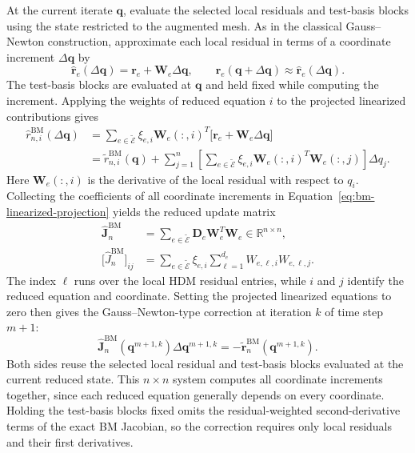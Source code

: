 \documentclass[a4paper,12pt]{article}
\newcommand{\vect}[1]{\boldsymbol{#1}}
\newcommand{\matr}[1]{\boldsymbol{#1}}
\begin{document}
At the current iterate $\vect{q}$, evaluate the selected local residuals and test-basis blocks using the state restricted to the augmented mesh. As in the classical Gauss--Newton construction, approximate each local residual in terms of a coordinate increment $\Delta\vect{q}$ by
\begin{equation}
 \widehat{\vect{r}}_e(\Delta\vect{q})
 =\vect{r}_e+\matr{W}_e\Delta\vect{q},
 \qquad
 \vect{r}_e(\vect{q}+\Delta\vect{q})\approx\widehat{\vect{r}}_e(\Delta\vect{q}).
 \label{eq:bm-linearized-local}
\end{equation}
The test-basis blocks are evaluated at $\vect{q}$ and held fixed while computing the increment. Applying the weights of reduced equation $i$ to the projected linearized contributions gives
\begin{equation}
 \begin{aligned}
 \widehat r_{n,i}^{\mathrm{BM}}(\Delta\vect{q})
 &=\sum_{e\in\widetilde{\mathcal E}}\xi_{e,i}
      \matr{W}_e(:,i)^T
       \bigl[\vect{r}_e+\matr{W}_e\Delta\vect{q}\bigr]\\
 &=\widetilde r_{n,i}^{\mathrm{BM}}(\vect{q})
   +\sum_{j=1}^n
       \left[\sum_{e\in\widetilde{\mathcal E}}\xi_{e,i}
           \matr{W}_e(:,i)^T\matr{W}_e(:,j)\right]\Delta q_j.
 \end{aligned}
 \label{eq:bm-linearized-projection}
\end{equation}
Here $\matr{W}_e(:,i)$ is the derivative of the local residual with respect to $q_i$. Collecting the coefficients of all coordinate increments in Equation~\eqref{eq:bm-linearized-projection} yields the reduced update matrix
\begin{equation}
 \begin{aligned}
 \widehat{\matr{J}}_n^{\mathrm{BM}}
 &=\sum_{e\in\widetilde{\mathcal E}}
       \matr{D}_e\matr{W}_e^T\matr{W}_e
       \in\mathbb R^{n\times n},\\
 \bigl[\widehat J_n^{\mathrm{BM}}\bigr]_{ij}
 &=\sum_{e\in\widetilde{\mathcal E}}\xi_{e,i}
       \sum_{\ell=1}^{d_e}W_{e,\ell,i}W_{e,\ell,j}.
 \end{aligned}
 \label{eq:bm-update-matrix}
\end{equation}
The index $\ell$ runs over the local HDM residual entries, while $i$ and $j$ identify the reduced equation and coordinate. Setting the projected linearized equations to zero then gives the Gauss--Newton-type correction at iteration $k$ of time step $m+1$:
\begin{equation}
 \widehat{\matr{J}}_n^{\mathrm{BM}}(\vect{q}^{m+1,k})
       \Delta\vect{q}^{m+1,k}
 =-\widetilde{\vect{r}}_n^{\mathrm{BM}}(\vect{q}^{m+1,k}).
 \label{eq:bm-gn}
\end{equation}
Both sides reuse the selected local residual and test-basis blocks evaluated at the current reduced state. This $n\times n$ system computes all coordinate increments together, since each reduced equation generally depends on every coordinate. Holding the test-basis blocks fixed omits the residual-weighted second-derivative terms of the exact BM Jacobian, so the correction requires only local residuals and their first derivatives.
\end{document}
